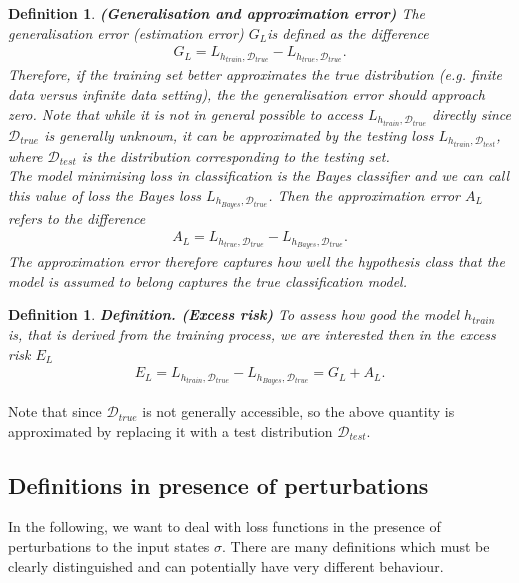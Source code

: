 \documentclass[onecolumn,prx, superscriptaddress,longbibliography,margin=1mm 11pt]{revtex4-2}
\newtheorem{definition}[theorem]{Definition}
\begin{document}
\begin{definition} \textbf{(Generalisation and approximation error)} The \textit{generalisation error} (estimation error) $G_L$is defined as the difference
\begin{align}
    G_L=L_{h_{train}, \mathcal{D}_{true}}-L_{h_{true}, \mathcal{D}_{true}}.
\end{align}
Therefore, if the training set better approximates the true distribution (e.g. finite data versus infinite data setting), the the generalisation error should approach zero.
Note that while it is not in general possible to access $L_{h_{train}, \mathcal{D}_{true}}$ directly since $\mathcal{D}_{true}$ is generally unknown, it can be approximated by the \textit{testing loss} $L_{h_{train}, \mathcal{D}_{test}}$, where $\mathcal{D}_{test}$ is the distribution corresponding to the testing set. \\

The model minimising loss in classification is the Bayes classifier and we can call this value of loss the \textit{Bayes loss} $L_{h_{Bayes}, \mathcal{D}_{true}}$. Then the \textit{approximation error} $A_L$ refers to the difference 
\begin{align}
    A_L=L_{h_{true}, \mathcal{D}_{true}}-L_{h_{Bayes}, \mathcal{D}_{true}}.
\end{align}
The approximation error therefore captures how well the hypothesis class that the model is assumed to belong captures the true classification model. 
\end{definition}

\begin{definition} \textbf{Definition. (Excess risk)}
To assess how good the model $h_{train}$ is, that is derived from the training process, we are interested then in the \textit{excess risk} $E_L$
\begin{align}
    E_L=L_{h_{train}, \mathcal{D}_{true}}-L_{h_{Bayes}, \mathcal{D}_{true}}=G_L+A_L.
\end{align}
\end{definition}
Note that since $\mathcal{D}_{true}$ is not generally accessible, so the above quantity is approximated by replacing it with a test distribution $\mathcal{D}_{test}$.\\
\subsection{Definitions in presence of perturbations}
In the following, we want to deal with loss functions in the presence of perturbations to the input states $\sigma$. There are many definitions which must be clearly distinguished and can potentially have very different behaviour. \\
\end{document}
